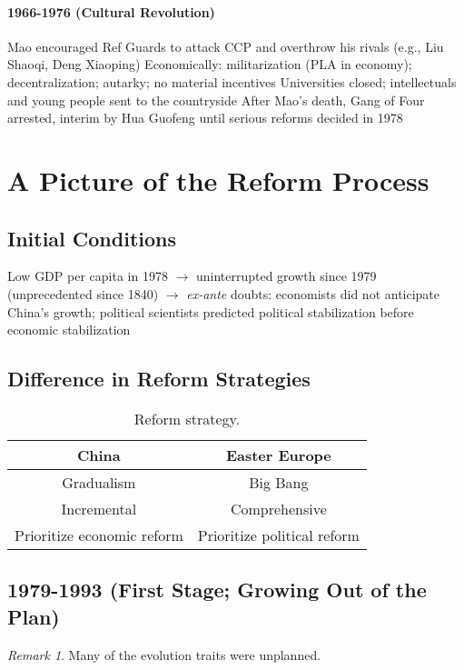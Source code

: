 \documentclass[11pt]{article}
\theoremstyle{definition}
\theoremstyle{remark}
\newtheorem*{remark}{Remark}
\begin{document}
\paragraph{1966-1976 (Cultural Revolution)}
\begin{outline}[enumerate]
\1 Mao encouraged Ref Guards to attack CCP and overthrow his rivals (e.g., Liu Shaoqi, Deng Xiaoping)
\1 Economically: militarization (PLA in economy); decentralization; autarky; no material incentives
\1 Universities closed; intellectuals and young people sent to the countryside
\1 After Mao's death, Gang of Four arrested, interim by Hua Guofeng until serious reforms decided in 1978
\end{outline}
\clearpage

\section{A Picture of the Reform Process}
\subsection{Initial Conditions}
\begin{outline}[enumerate]
Low GDP per capita in 1978 $\to$ uninterrupted growth since 1979 (unprecedented since 1840) $\to$ \textit{ex-ante} doubts: economists did not anticipate China's growth; political scientists predicted political stabilization before economic stabilization
\end{outline}

\subsection{Difference in Reform Strategies}
\begin{table}[ht]
\centering
\caption{Reform strategy.}
\begin{tabular}[t]{cc}
\toprule
China&Easter Europe\\
\midrule
Gradualism&Big Bang\\
Incremental&Comprehensive\\
Prioritize economic reform&Prioritize political reform\\
\bottomrule
\end{tabular}
\end{table}%

\subsection{1979-1993 (First Stage; Growing Out of the Plan)}
\begin{remark}
Many of the evolution traits were unplanned.
\end{remark}
\end{document}
